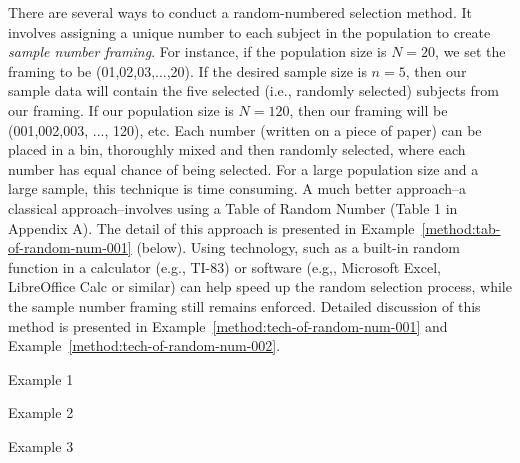 There are several ways to conduct a random-numbered selection method. It involves assigning a unique number to each subject in the population to create {\it{sample number framing}}. For instance, if the population size is $N=20$, we set the framing to be (01,02,03,...,20). If the desired sample size is $n=5$, then our sample data will contain the five selected (i.e., randomly selected) subjects from our framing. If our population size is $N=120$, then our framing will be (001,002,003, ..., 120), etc. Each number (written on a piece of paper) can be placed in a bin, thoroughly mixed and then randomly selected, where each number has equal chance of being selected. For a large population size and a large sample, this technique is time consuming. A much better approach--a classical approach--involves using a Table of Random Number (Table 1 in Appendix A). The detail of this approach is presented in Example~\ref{method:tab-of-random-num-001} (below). Using technology, such as a built-in random function in a calculator (e.g., TI-83) or software (e.g,, Microsoft Excel, LibreOffice Calc or similar) can help speed up the random selection process, while the sample number framing still remains enforced. Detailed discussion of this method is presented in Example~\ref{method:tech-of-random-num-001} and Example~\ref{method:tech-of-random-num-002}. 


\begin{example}  \label{method:tab-of-random-num-001} 
Example 1 
\end{example} 

\begin{example}  \label{method:tech-of-random-num-001} 
   Example 2 
\end{example} 

\begin{example}  \label{method:tech-of-random-num-002} 
   Example 3 
\end{example} 

